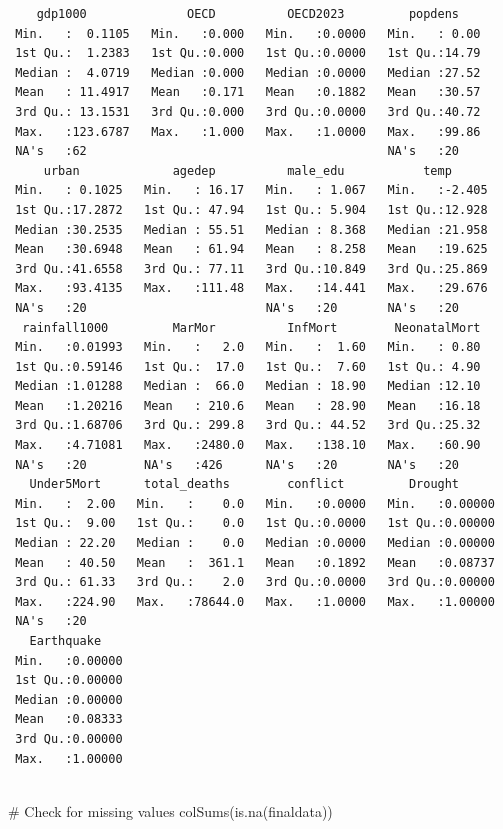 \documentclass[
  letterpaper,
  DIV=11,
  numbers=noendperiod]{scrartcl}
\newenvironment{Shaded}{\begin{snugshade}}{\end{snugshade}}
\newcommand{\CommentTok}[1]{\textcolor[rgb]{0.37,0.37,0.37}{#1}}
\newcommand{\FunctionTok}[1]{\textcolor[rgb]{0.28,0.35,0.67}{#1}}
\newcommand{\NormalTok}[1]{\textcolor[rgb]{0.00,0.23,0.31}{#1}}
\begin{document}
\begin{verbatim}
    gdp1000              OECD          OECD2023         popdens     
 Min.   :  0.1105   Min.   :0.000   Min.   :0.0000   Min.   : 0.00  
 1st Qu.:  1.2383   1st Qu.:0.000   1st Qu.:0.0000   1st Qu.:14.79  
 Median :  4.0719   Median :0.000   Median :0.0000   Median :27.52  
 Mean   : 11.4917   Mean   :0.171   Mean   :0.1882   Mean   :30.57  
 3rd Qu.: 13.1531   3rd Qu.:0.000   3rd Qu.:0.0000   3rd Qu.:40.72  
 Max.   :123.6787   Max.   :1.000   Max.   :1.0000   Max.   :99.86  
 NA's   :62                                          NA's   :20     
     urban             agedep          male_edu           temp       
 Min.   : 0.1025   Min.   : 16.17   Min.   : 1.067   Min.   :-2.405  
 1st Qu.:17.2872   1st Qu.: 47.94   1st Qu.: 5.904   1st Qu.:12.928  
 Median :30.2535   Median : 55.51   Median : 8.368   Median :21.958  
 Mean   :30.6948   Mean   : 61.94   Mean   : 8.258   Mean   :19.625  
 3rd Qu.:41.6558   3rd Qu.: 77.11   3rd Qu.:10.849   3rd Qu.:25.869  
 Max.   :93.4135   Max.   :111.48   Max.   :14.441   Max.   :29.676  
 NA's   :20                         NA's   :20       NA's   :20      
  rainfall1000         MarMor          InfMort        NeonatalMort  
 Min.   :0.01993   Min.   :   2.0   Min.   :  1.60   Min.   : 0.80  
 1st Qu.:0.59146   1st Qu.:  17.0   1st Qu.:  7.60   1st Qu.: 4.90  
 Median :1.01288   Median :  66.0   Median : 18.90   Median :12.10  
 Mean   :1.20216   Mean   : 210.6   Mean   : 28.90   Mean   :16.18  
 3rd Qu.:1.68706   3rd Qu.: 299.8   3rd Qu.: 44.52   3rd Qu.:25.32  
 Max.   :4.71081   Max.   :2480.0   Max.   :138.10   Max.   :60.90  
 NA's   :20        NA's   :426      NA's   :20       NA's   :20     
   Under5Mort      total_deaths        conflict         Drought       
 Min.   :  2.00   Min.   :    0.0   Min.   :0.0000   Min.   :0.00000  
 1st Qu.:  9.00   1st Qu.:    0.0   1st Qu.:0.0000   1st Qu.:0.00000  
 Median : 22.20   Median :    0.0   Median :0.0000   Median :0.00000  
 Mean   : 40.50   Mean   :  361.1   Mean   :0.1892   Mean   :0.08737  
 3rd Qu.: 61.33   3rd Qu.:    2.0   3rd Qu.:0.0000   3rd Qu.:0.00000  
 Max.   :224.90   Max.   :78644.0   Max.   :1.0000   Max.   :1.00000  
 NA's   :20                                                           
   Earthquake     
 Min.   :0.00000  
 1st Qu.:0.00000  
 Median :0.00000  
 Mean   :0.08333  
 3rd Qu.:0.00000  
 Max.   :1.00000  
                  
\end{verbatim}

\begin{Shaded}
\begin{Highlighting}[]
\CommentTok{\# Check for missing values}
\FunctionTok{colSums}\NormalTok{(}\FunctionTok{is.na}\NormalTok{(finaldata))}
\end{Highlighting}
\end{Shaded}
\end{document}
